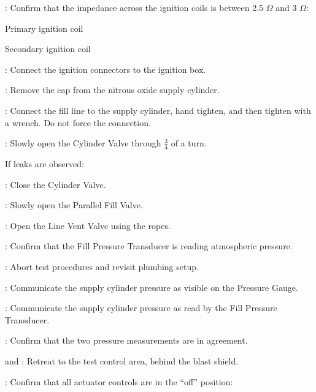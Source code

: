 \begin{checklist}
    \item \secondary: Confirm that the impedance across the ignition coils is between 2.5 $\Omega$ and 3 $\Omega$:
    \begin{checklist}
            \item Primary ignition coil
            \item Secondary ignition coil
    \end{checklist}
    \item \secondary: Connect the ignition connectors to the ignition box. 
    \item \primary{}: Remove the cap from the nitrous oxide supply cylinder.
    \item \primary{}: Connect the fill line to the supply cylinder, hand tighten, and then tighten with a wrench. Do not force the connection.
    \item \primary: Slowly open the Cylinder Valve through $\frac{3}{4}$ of a turn.
    \begin{checklist}[label=$\bullet$]
        \item If leaks are observed:
        \begin{checklist}
            \item \primary{}: Close the Cylinder Valve.
            \item \primary{}: Slowly open the Parallel Fill Valve.
            \item \primary: Open the Line Vent Valve using the ropes.
            \item \daq{}: Confirm that the Fill Pressure Transducer is reading atmospheric pressure.
            \item \ops{}: Abort test procedures and revisit plumbing setup.
        \end{checklist}
    \end{checklist}
    \item \primary{}: Communicate the supply cylinder pressure as visible on the Pressure Gauge.
    \item \daq{}: Communicate the supply cylinder pressure as read by the Fill Pressure Transducer.
    \item \daq{}: Confirm that the two pressure measurements are in agreement.
    \item \primary{} and \secondary: Retreat to the test control area, behind the blast shield.
    \item \primary{}: Confirm that all actuator controls are in the ``off'' position:
    \begin{checklist}

\end{checklist}
\end{checklist}
